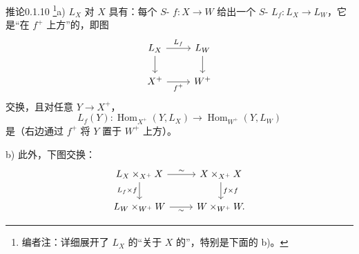 \begin{SGAresult}{推论}{0.1.10}
\footnote{编者注：详细展开了 $L_X$ 的“关于 $X$ 的”，特别是下面的 b)。}a) $L_X$ 对 $X$ 具有：每个 $S$- $f:X\to W$ 给出一个 $S$- $L_f:L_X\to L_W$，它是“在 $f^+$ 上方”的，即图
\[\begin{tikzcd}L_X\arrow[r,"L_f"]\arrow[d]&L_W\arrow[d]\\X^+\arrow[r,"f^+"']&W^+\end{tikzcd}\]
交换，且对任意 $Y\to X^+$，
\[L_f(Y):\operatorname{Hom}_{X^+}(Y,L_X)\longrightarrow\operatorname{Hom}_{W^+}(Y,L_W)\]
是（右边通过 $f^+$ 将 $Y$ 置于 $W^+$ 上方）。

b) 此外，下图交换：
\[\begin{tikzcd}
L_X\times_{X^+}X\arrow[r,"\sim"]\arrow[d,"L_f\times f"']&X\times_{X^+}X\arrow[d,"f\times f"]\\
L_W\times_{W^+}W\arrow[r,"\sim"']&W\times_{W^+}W.
\end{tikzcd}\]
\end{SGAresult}
